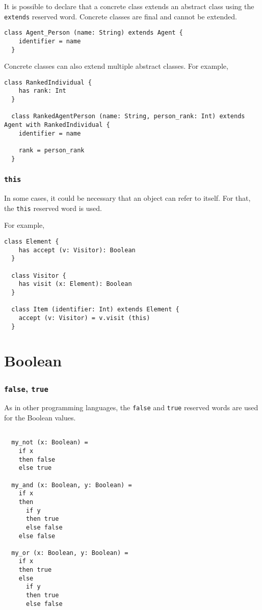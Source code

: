 \documentclass[12pt,a4paper]{book}
\newcommand{\srccode}[1]{\texttt{{#1}}}
\newcommand{\reservedWord}[1]{{\color{blue}\srccode{#1}}\xspace}
\newcommand{\sextends}{\reservedWord{extends}}
\newcommand{\sthis}{\reservedWord{this}}
\newcommand{\sfalse}{\reservedWord{false}}
\newcommand{\strue}{\reservedWord{true}}
\begin{document}
    It is possible to declare that a concrete class extends an abstract class using the \sextends reserved word.
    Concrete classes are final and cannot be extended.

    \begin{lstlisting}[label={lst:exampleExtends}]
  class Agent_Person (name: String) extends Agent {
    identifier = name
  }
    \end{lstlisting}

    Concrete classes can also extend multiple abstract classes.
    For example,
    \begin{lstlisting}[label={lst:exampleWith}]
  class RankedIndividual {
    has rank: Int
  }

  class RankedAgentPerson (name: String, person_rank: Int) extends Agent with RankedIndividual {
    identifier = name

    rank = person_rank
  }
    \end{lstlisting}

    \subsubsection{\sthis}

    In some cases, it could be necessary that an object can refer to itself.
    For that, the \sthis reserved word is used.

    For example,
    \begin{lstlisting}[label={lst:exampleExtendsElement}]
  class Element {
    has accept (v: Visitor): Boolean
  }

  class Visitor {
    has visit (x: Element): Boolean
  }

  class Item (identifier: Int) extends Element {
    accept (v: Visitor) = v.visit (this)
  }
    \end{lstlisting}


    \section{Boolean}

    \subsubsection{\sfalse, \strue}

    As in other programming languages, the \sfalse and \strue reserved words are used for the Boolean values.

    \begin{lstlisting}[label={lst:exampleFalseTrue}]

  my_not (x: Boolean) =
    if x
    then false
    else true

  my_and (x: Boolean, y: Boolean) =
    if x
    then
      if y
      then true
      else false
    else false

  my_or (x: Boolean, y: Boolean) =
    if x
    then true
    else
      if y
      then true
      else false
    \end{lstlisting}
\end{document}
